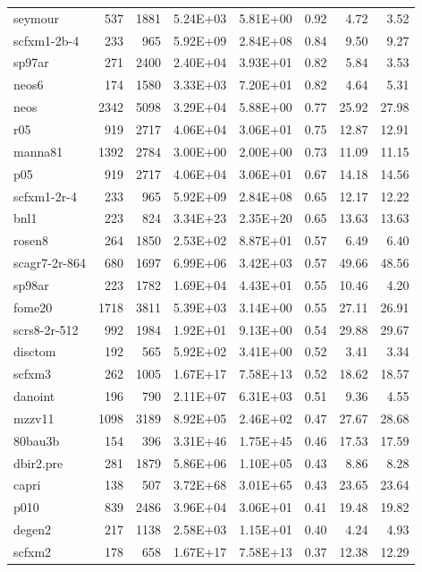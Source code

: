 \documentclass[10pt]{article}
\begin{document}
\begin{longtable}{|l|r|r|r|r|r|r|r|}
seymour	&	537	&	1881	&	5.24E+03	&	5.81E+00	&	0.92	&	4.72	&	3.52	\\
scfxm1-2b-4	&	233	&	965	&	5.92E+09	&	2.84E+08	&	0.84	&	9.50	&	9.27	\\
sp97ar	&	271	&	2400	&	2.40E+04	&	3.93E+01	&	0.82	&	5.84	&	3.53	\\
neos6	&	174	&	1580	&	3.33E+03	&	7.20E+01	&	0.82	&	4.64	&	5.31	\\
neos	&	2342	&	5098	&	3.29E+04	&	5.88E+00	&	0.77	&	25.92	&	27.98	\\
r05	&	919	&	2717	&	4.06E+04	&	3.06E+01	&	0.75	&	12.87	&	12.91	\\
manna81	&	1392	&	2784	&	3.00E+00	&	2.00E+00	&	0.73	&	11.09	&	11.15	\\
p05	&	919	&	2717	&	4.06E+04	&	3.06E+01	&	0.67	&	14.18	&	14.56	\\
scfxm1-2r-4	&	233	&	965	&	5.92E+09	&	2.84E+08	&	0.65	&	12.17	&	12.22	\\
bnl1	&	223	&	824	&	3.34E+23	&	2.35E+20	&	0.65	&	13.63	&	13.63	\\
rosen8	&	264	&	1850	&	2.53E+02	&	8.87E+01	&	0.57	&	6.49	&	6.40	\\
scagr7-2r-864	&	680	&	1697	&	6.99E+06	&	3.42E+03	&	0.57	&	49.66	&	48.56	\\
sp98ar	&	223	&	1782	&	1.69E+04	&	4.43E+01	&	0.55	&	10.46	&	4.20	\\
fome20	&	1718	&	3811	&	5.39E+03	&	3.14E+00	&	0.55	&	27.11	&	26.91	\\
scrs8-2r-512	&	992	&	1984	&	1.92E+01	&	9.13E+00	&	0.54	&	29.88	&	29.67	\\
disctom	&	192	&	565	&	5.92E+02	&	3.41E+00	&	0.52	&	3.41	&	3.34	\\
scfxm3	&	262	&	1005	&	1.67E+17	&	7.58E+13	&	0.52	&	18.62	&	18.57	\\
danoint	&	196	&	790	&	2.11E+07	&	6.31E+03	&	0.51	&	9.36	&	4.55	\\
mzzv11	&	1098	&	3189	&	8.92E+05	&	2.46E+02	&	0.47	&	27.67	&	28.68	\\
80bau3b	&	154	&	396	&	3.31E+46	&	1.75E+45	&	0.46	&	17.53	&	17.59	\\
dbir2.pre	&	281	&	1879	&	5.86E+06	&	1.10E+05	&	0.43	&	8.86	&	8.28	\\
capri	&	138	&	507	&	3.72E+68	&	3.01E+65	&	0.43	&	23.65	&	23.64	\\
p010	&	839	&	2486	&	3.96E+04	&	3.06E+01	&	0.41	&	19.48	&	19.82	\\
degen2	&	217	&	1138	&	2.58E+03	&	1.15E+01	&	0.40	&	4.24	&	4.93	\\
scfxm2	&	178	&	658	&	1.67E+17	&	7.58E+13	&	0.37	&	12.38	&	12.29	\\

\end{longtable}
\end{document}
